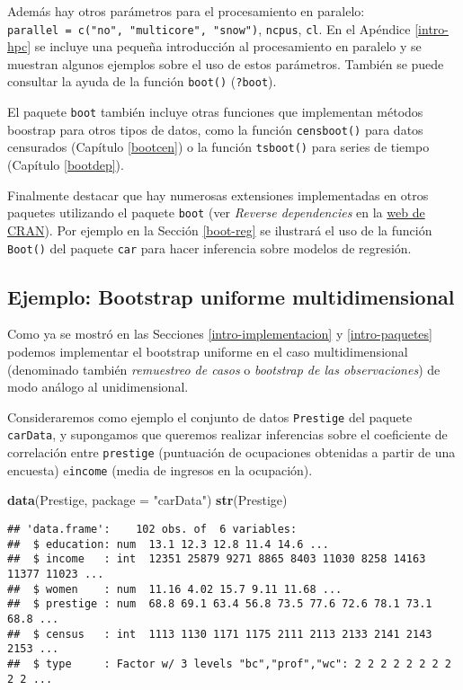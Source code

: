 \documentclass[
]{book}
\newenvironment{Shaded}{\begin{snugshade}}{\end{snugshade}}
\newcommand{\DataTypeTok}[1]{\textcolor[rgb]{0.13,0.29,0.53}{#1}}
\newcommand{\KeywordTok}[1]{\textcolor[rgb]{0.13,0.29,0.53}{\textbf{#1}}}
\newcommand{\NormalTok}[1]{#1}
\newcommand{\StringTok}[1]{\textcolor[rgb]{0.31,0.60,0.02}{#1}}
\theoremstyle{break}
\theoremstyle{definition}
\theoremstyle{definition}
\theoremstyle{definition}
\theoremstyle{remark}
\begin{document}
Además hay otros parámetros para el procesamiento en paralelo: \texttt{parallel\ =\ c("no",\ "multicore",\ "snow")}, \texttt{ncpus}, \texttt{cl}.
En el Apéndice \ref{intro-hpc} se incluye una pequeña introducción al procesamiento en paralelo y se muestran algunos ejemplos sobre el uso de estos parámetros.
También se puede consultar la ayuda de la función \texttt{boot()} (\texttt{?boot}).

El paquete \texttt{boot} también incluye otras funciones que implementan métodos
boostrap para otros tipos de datos, como la función \texttt{censboot()} para datos
censurados (Capítulo \ref{bootcen}) o la función \texttt{tsboot()} para series de tiempo (Capítulo \ref{bootdep}).

Finalmente destacar que hay numerosas extensiones implementadas en otros paquetes utilizando el paquete \texttt{boot} (ver \emph{Reverse dependencies} en la \href{https://cran.r-project.org/package=boot}{web de CRAN}).
Por ejemplo en la Sección \ref{boot-reg} se ilustrará el uso de la función \texttt{Boot()} del paquete \texttt{car} para hacer inferencia sobre modelos de regresión.

\hypertarget{boot-unif-multi}{%
\subsection{Ejemplo: Bootstrap uniforme multidimensional}\label{boot-unif-multi}}

Como ya se mostró en las Secciones \ref{intro-implementacion} y \ref{intro-paquetes} podemos implementar el bootstrap uniforme en el caso multidimensional (denominado también \emph{remuestreo de casos} o \emph{bootstrap de las observaciones}) de modo análogo al unidimensional.

Consideraremos como ejemplo el conjunto de datos \texttt{Prestige} del paquete \texttt{carData}, y supongamos que queremos realizar inferencias sobre el coeficiente de correlación entre \texttt{prestige} (puntuación de ocupaciones obtenidas a partir de una encuesta) e\texttt{income} (media de ingresos en la ocupación).

\begin{Shaded}
\begin{Highlighting}[]
\KeywordTok{data}\NormalTok{(Prestige, }\DataTypeTok{package =} \StringTok{"carData"}\NormalTok{)}
\KeywordTok{str}\NormalTok{(Prestige)}
\end{Highlighting}
\end{Shaded}

\begin{verbatim}
## 'data.frame':    102 obs. of  6 variables:
##  $ education: num  13.1 12.3 12.8 11.4 14.6 ...
##  $ income   : int  12351 25879 9271 8865 8403 11030 8258 14163 11377 11023 ...
##  $ women    : num  11.16 4.02 15.7 9.11 11.68 ...
##  $ prestige : num  68.8 69.1 63.4 56.8 73.5 77.6 72.6 78.1 73.1 68.8 ...
##  $ census   : int  1113 1130 1171 1175 2111 2113 2133 2141 2143 2153 ...
##  $ type     : Factor w/ 3 levels "bc","prof","wc": 2 2 2 2 2 2 2 2 2 2 ...
\end{verbatim}
\end{document}
